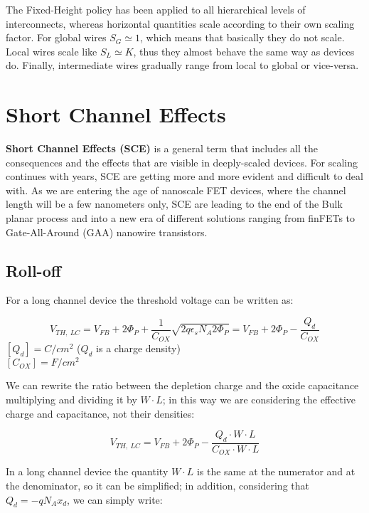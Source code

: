 \documentclass[a4paper, 12pt, twoside, openright]{report}
\begin{document}
The Fixed-Height policy has been applied to all hierarchical levels of interconnects, whereas horizontal quantities scale according to their own scaling factor. For global wires $S_{G} \simeq 1$, which means that basically they do not scale. Local wires scale like $S_{L} \simeq K$, thus they almost behave the same way as devices do. Finally, intermediate wires gradually range from local to global or vice-versa.

\section{Short Channel Effects}

\textbf{Short Channel Effects (SCE)} is a general term that includes all the consequences and the effects that are visible in deeply-scaled devices. For scaling continues with years, SCE are getting more and more evident and difficult to deal with. As we are entering the age of nanoscale FET devices, where the channel length will be a few nanometers only, SCE are leading to the end of the Bulk planar process and into a new era of different solutions ranging from finFETs to Gate-All-Around (GAA) nanowire transistors. 

\subsection{Roll-off} \label{subsec:roll_off}

For a long channel device the threshold voltage can be written as:

	\begin{equation}
	V_{TH,\ LC} = V_{FB} + 2\Phi_P + \frac{1}{C_{OX}} \sqrt{2q \epsilon_s N_A 2 \Phi_P} = V_{FB} + 2\Phi_P - \frac{Q_d}{C_{OX}}
	\end{equation}
	$[Q_{d}] = C/cm^2$ ($Q_{d}$ is a charge density)\\
	$[C_{OX}] = F/cm^2$

We can rewrite the ratio between the depletion charge and the oxide capacitance multiplying and dividing it by $W \cdot L$; in this way we are considering the effective charge and capacitance, not their densities:

	\begin{equation}
	V_{TH,\ LC} = V_{FB} + 2\Phi_P - \frac{Q_d \cdot W \cdot L}{C_{OX} \cdot W \cdot L}
	\end{equation}

In a long channel device the quantity $W \cdot L$ is the same at the numerator and at the denominator, so it can be simplified; in addition, considering that $Q_d = -q N_A x_d$, we can simply write:
\end{document}
